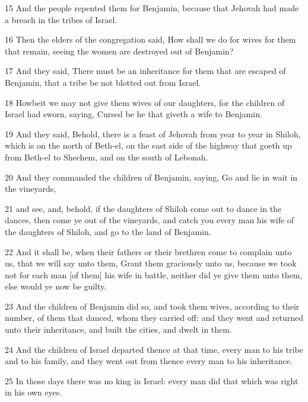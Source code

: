 \par 15 And the people repented them for Benjamin, because that Jehovah had made a breach in the tribes of Israel.
\par 16 Then the elders of the congregation said, How shall we do for wives for them that remain, seeing the women are destroyed out of Benjamin?
\par 17 And they said, There must be an inheritance for them that are escaped of Benjamin, that a tribe be not blotted out from Israel.
\par 18 Howbeit we may not give them wives of our daughters, for the children of Israel had sworn, saying, Cursed be he that giveth a wife to Benjamin.
\par 19 And they said, Behold, there is a feast of Jehovah from year to year in Shiloh, which is on the north of Beth-el, on the east side of the highway that goeth up from Beth-el to Shechem, and on the south of Lebonah.
\par 20 And they commanded the children of Benjamin, saying, Go and lie in wait in the vineyards,
\par 21 and see, and, behold, if the daughters of Shiloh come out to dance in the dances, then come ye out of the vineyards, and catch you every man his wife of the daughters of Shiloh, and go to the land of Benjamin.
\par 22 And it shall be, when their fathers or their brethren come to complain unto us, that we will say unto them, Grant them graciously unto us, because we took not for each man [of them] his wife in battle, neither did ye give them unto them, else would ye now be guilty.
\par 23 And the children of Benjamin did so, and took them wives, according to their number, of them that danced, whom they carried off: and they went and returned unto their inheritance, and built the cities, and dwelt in them.
\par 24 And the children of Israel departed thence at that time, every man to his tribe and to his family, and they went out from thence every man to his inheritance.
\par 25 In those days there was no king in Israel: every man did that which was right in his own eyes.

